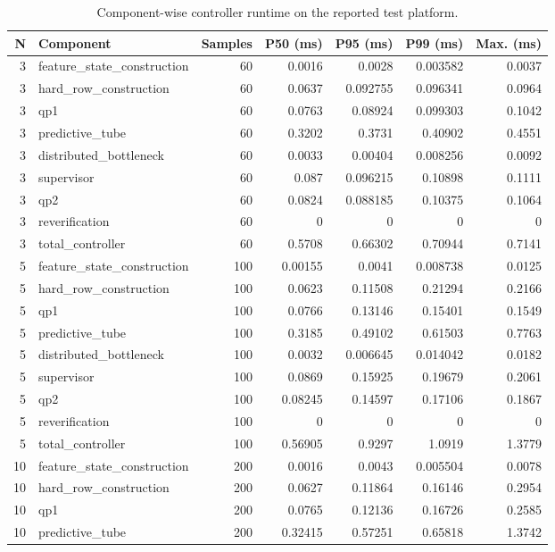 \begin{table}[!t]
\centering
\scriptsize
\caption{Component-wise controller runtime on the reported test platform.}
\label{tab:phase2m-runtime}
\begin{tabular}{rlrrrrr}
\hline
N & Component & Samples & P50 (ms) & P95 (ms) & P99 (ms) & Max. (ms) \\
\hline
3 & feature\_state\_construction & 60 & 0.0016 & 0.0028 & 0.003582 & 0.0037 \\
3 & hard\_row\_construction & 60 & 0.0637 & 0.092755 & 0.096341 & 0.0964 \\
3 & qp1 & 60 & 0.0763 & 0.08924 & 0.099303 & 0.1042 \\
3 & predictive\_tube & 60 & 0.3202 & 0.3731 & 0.40902 & 0.4551 \\
3 & distributed\_bottleneck & 60 & 0.0033 & 0.00404 & 0.008256 & 0.0092 \\
3 & supervisor & 60 & 0.087 & 0.096215 & 0.10898 & 0.1111 \\
3 & qp2 & 60 & 0.0824 & 0.088185 & 0.10375 & 0.1064 \\
3 & reverification & 60 & 0 & 0 & 0 & 0 \\
3 & total\_controller & 60 & 0.5708 & 0.66302 & 0.70944 & 0.7141 \\
5 & feature\_state\_construction & 100 & 0.00155 & 0.0041 & 0.008738 & 0.0125 \\
5 & hard\_row\_construction & 100 & 0.0623 & 0.11508 & 0.21294 & 0.2166 \\
5 & qp1 & 100 & 0.0766 & 0.13146 & 0.15401 & 0.1549 \\
5 & predictive\_tube & 100 & 0.3185 & 0.49102 & 0.61503 & 0.7763 \\
5 & distributed\_bottleneck & 100 & 0.0032 & 0.006645 & 0.014042 & 0.0182 \\
5 & supervisor & 100 & 0.0869 & 0.15925 & 0.19679 & 0.2061 \\
5 & qp2 & 100 & 0.08245 & 0.14597 & 0.17106 & 0.1867 \\
5 & reverification & 100 & 0 & 0 & 0 & 0 \\
5 & total\_controller & 100 & 0.56905 & 0.9297 & 1.0919 & 1.3779 \\
10 & feature\_state\_construction & 200 & 0.0016 & 0.0043 & 0.005504 & 0.0078 \\
10 & hard\_row\_construction & 200 & 0.0627 & 0.11864 & 0.16146 & 0.2954 \\
10 & qp1 & 200 & 0.0765 & 0.12136 & 0.16726 & 0.2585 \\
10 & predictive\_tube & 200 & 0.32415 & 0.57251 & 0.65818 & 1.3742 \\

\end{tabular}
\end{table}
